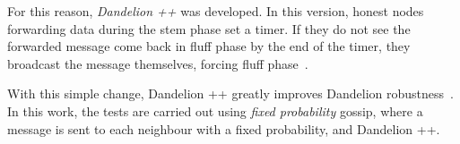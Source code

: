 For this reason, \textit{Dandelion ++} was developed. In this version, honest nodes forwarding data during the stem phase set a timer. If they do not see the forwarded message come back in fluff phase by the end of the timer, they broadcast the message themselves, forcing fluff phase~\cite{dandplus}.

With this simple change, Dandelion ++ greatly improves Dandelion robustness~\cite{lunes-dissemination}.\\

In this work, the tests are carried out using \textit{fixed probability} gossip, where a message is sent to each neighbour with a fixed probability, and Dandelion ++.